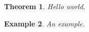 \documentclass{article}
\theoremstyle{TheoremNum}
\newtheorem{thm}{Theorem}
\newtheorem{example}[thm]{Example}
\begin{document}
\begin{thm}
  Hello world.
\end{thm}
\begin{example}
  An example.
\end{example}
\end{document}
